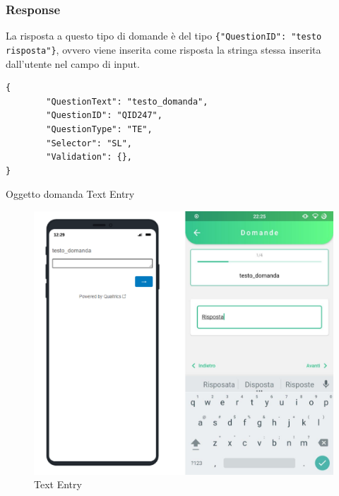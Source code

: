 \subsubsection{Response}
La risposta a questo tipo di domande è del tipo \texttt{\{"QuestionID": "testo risposta"\}}, ovvero viene inserita come risposta la stringa stessa inserita dall'utente nel campo di input.

\newpage
\begin{json}
\begin{verbatim}
{
        "QuestionText": "testo_domanda",
        "QuestionID": "QID247",
        "QuestionType": "TE",
        "Selector": "SL",
        "Validation": {},
}
\end{verbatim}
\caption{Oggetto domanda Text Entry}
\label{json:text_entry}
\end{json}

\begin{figure}[h]
\centering
\includegraphics[width=\textwidth]{img/text_entry_flutter}
\caption{Text Entry}
\label{fig:text_entry}
\end{figure}

\newpage
